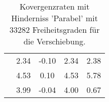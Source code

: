 \begin{table}
\begin{tabular}{c|cc|cc|}
\multicolumn{1}{|c|}{} & \multicolumn{1}{|c|}{      2.34} & \multicolumn{1}{|c|}{     -0.10} & \multicolumn{1}{|c|}{      2.34} & \multicolumn{1}{|c|}{      2.38} \\ 
\multicolumn{1}{|c|}{} & \multicolumn{1}{|c|}{      4.53} & \multicolumn{1}{|c|}{      0.10} & \multicolumn{1}{|c|}{      4.53} & \multicolumn{1}{|c|}{      5.78} \\ 
\multicolumn{1}{|c|}{} & \multicolumn{1}{|c|}{      3.99} & \multicolumn{1}{|c|}{     -0.04} & \multicolumn{1}{|c|}{      4.00} & \multicolumn{1}{|c|}{      0.67} \\ 
\hline 
\end{tabular}\caption{Kovergenzraten mit Hinderniss 'Parabel' mit 33282 Freiheitsgraden für die Verschiebung.}\label{tab:Rate_Parabel_level6}
\end{table} 
